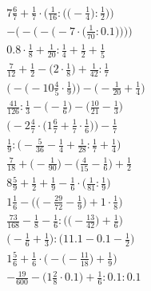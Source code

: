 \documentclass[8pt]{article}
\begin{document}
\begin{align}
7\frac{6}{7} + \frac{1}{7} \cdot \bigg(\frac{1}{16} : \Big(\big(-\frac{1}{4}\big) : \frac{1}{2}\Big)\bigg) \\
-\Bigg(-\bigg(-\Big(-7 \cdot \big(\frac{1}{70} : 0.1\big)\Big)\bigg)\Bigg) \\
0.8 \cdot \frac{1}{8} + \frac{1}{20} : \frac{1}{4} + \frac{1}{2} + \frac{1}{5} \\
\frac{7}{12} + \frac{1}{2} - \big(2 \cdot \frac{1}{8}\big) + \frac{1}{42} : \frac{1}{7} \\
\Big(-\big(-10\frac{4}{5} \cdot \frac{1}{9}\big)\Big) - \Big(-\frac{1}{20} + \frac{1}{4}\Big) \\
\frac{41}{126} : \frac{1}{3} - \big(-\frac{1}{6}\big) - \big(\frac{10}{21} - \frac{1}{3}\big) \\
\Big(-2\frac{4}{7} \cdot \big(1\frac{6}{7} + \frac{1}{7} \cdot \frac{1}{6}\big)\Big) - \frac{1}{7} \\
\frac{1}{9} : \big(-\frac{5}{36} - \frac{1}{4} + \frac{1}{28} : \frac{1}{7} + \frac{1}{4}\big) \\
\frac{7}{18} + \big(-\frac{1}{90}\big) - \big(\frac{4}{15} - \frac{1}{6}\big) + \frac{1}{2} \\
8\frac{5}{9} + \frac{1}{2} + \frac{1}{9} - \frac{1}{6} \cdot \big(\frac{1}{81} : \frac{1}{9}\big) \\
1\frac{1}{6} - \Big(\big(-\frac{29}{72} - \frac{1}{9}\big) + 1 \cdot \frac{1}{8}\Big) \\
\frac{73}{168} - \frac{1}{8} - \frac{1}{6} : \Big(\big(-\frac{13}{42}\big) + \frac{1}{6}\Big) \\
\big(-\frac{1}{6} + \frac{1}{3}\big) : \big(11.1 - 0.1 - \frac{1}{2}\big) \\
1\frac{5}{6} + \frac{1}{6} \cdot \Big(-\big(-\frac{11}{18}\big) + \frac{1}{9}\Big) \\
-\frac{19}{600} - \big(1\frac{2}{8} \cdot 0.1\big) + \frac{1}{6} : 0.1 : 0.1
\end{align}
\end{document}
